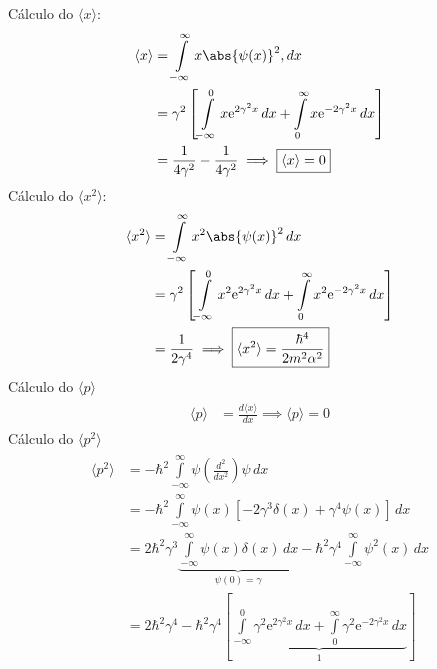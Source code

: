 \begin{prob}
\begin{sol}
\begin{enumerate}[label=\alph *)]
				Cálculo do $\langle x \rangle$:
					\begin{align}
							\begin{split}
								\langle x \rangle &= \int\limits_{-\infty}^{\infty} x \abs{\psi(x)}^{2} ,d{x}\\
																	&= \gamma^{2}\left[\int\limits_{-\infty}^{0}x \mathrm{e}^{2 \gamma^{2}x}\,d{x}+\int\limits_{0}^{\infty}x \mathrm{e}^{-2 \gamma^{2}x}\,d{x}\right]\\
																	&= \frac{1}{4 \gamma^{2}}-\frac{1}{4 \gamma^{2}}\implies \boxed{\langle x \rangle=0}
							\end{split}
					\end{align}
					Cálculo do $\langle x^{2} \rangle$:
					\begin{align}
							\begin{split}
								\langle x^{2} \rangle &= \int\limits_{-\infty}^{\infty}x^{2}\abs{\psi(x)}^{2}\,d{x}\\
																			&= \gamma^{2}\left[\int\limits_{-\infty}^{0}x^{2}\mathrm{e}^{2\gamma^{2}x}\,d{x}+\int\limits_{0}^{\infty}x^{2}\mathrm{e}^{-2 \gamma^{2}x}\,d{x}\right]\\
																			&= \frac{1}{2 \gamma^{4}}\implies \boxed{\langle x^{2} \rangle=\frac{\hbar^{4}}{2m^{2} \alpha^{2}}}
							\end{split}
					\end{align}
					Cálculo do $\langle p \rangle$
					\begin{align}
							\begin{split}
								\langle p \rangle &= \frac{d \langle x \rangle}{dx}\implies \boxed{\langle p \rangle=0}
							\end{split}
					\end{align}
					Cálculo do $\langle p^{2} \rangle$
					\begin{align}
						\begin{split}
							\langle p^{2} \rangle &= -\hbar^{2}\int\limits_{-\infty}^{\infty} \psi \left(\frac{d^{2}}{dx^{2}}\right) \psi\,d{x}\\
																		&= -\hbar^{2}\int\limits_{-\infty}^{\infty} \psi(x)\left[-2 \gamma^{3} \delta(x)+ \gamma^{4} \psi(x)\right]\,d{x}\\
																		&= 2\hbar^{2} \gamma^{3}\underbrace{\int\limits_{-\infty}^{\infty} \psi(x) \delta(x)\,d{x}}_{\displaystyle{\psi(0)=\gamma}}-\hbar^{2} \gamma^{4}\int\limits_{-\infty}^{\infty} \psi^{2}(x)\,d{x}\\
																		&=2\hbar^{2} \gamma^{4}-\hbar^{2} \gamma^{4}\left[\underbrace{\int\limits_{-\infty}^{0} \gamma^{2}\mathrm{e}^{2\gamma^{2}x}\,d{x}+\int\limits_{0}^{\infty} \gamma^{2}\mathrm{e}^{-2 \gamma^{2}x}\,d{x}}_{\displaystyle{1}}\right]\\

\end{split}
\end{align}
\end{enumerate}
\end{sol}
\end{prob}
